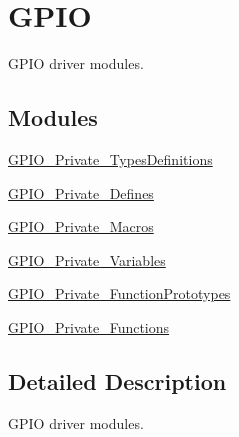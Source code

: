 \hypertarget{group___g_p_i_o}{\section{G\-P\-I\-O}
\label{group___g_p_i_o}
}


G\-P\-I\-O driver modules.  


\subsection*{Modules}
\begin{DoxyCompactItemize}
\item 
\hyperlink{group___g_p_i_o___private___types_definitions}{G\-P\-I\-O\-\_\-\-Private\-\_\-\-Types\-Definitions}
\item 
\hyperlink{group___g_p_i_o___private___defines}{G\-P\-I\-O\-\_\-\-Private\-\_\-\-Defines}
\item 
\hyperlink{group___g_p_i_o___private___macros}{G\-P\-I\-O\-\_\-\-Private\-\_\-\-Macros}
\item 
\hyperlink{group___g_p_i_o___private___variables}{G\-P\-I\-O\-\_\-\-Private\-\_\-\-Variables}
\item 
\hyperlink{group___g_p_i_o___private___function_prototypes}{G\-P\-I\-O\-\_\-\-Private\-\_\-\-Function\-Prototypes}
\item 
\hyperlink{group___g_p_i_o___private___functions}{G\-P\-I\-O\-\_\-\-Private\-\_\-\-Functions}
\end{DoxyCompactItemize}


\subsection{Detailed Description}
G\-P\-I\-O driver modules. 